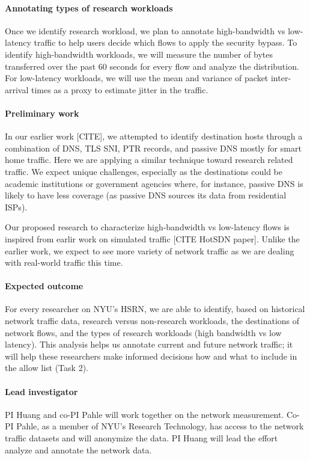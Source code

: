 \paragraph{Annotating types of research workloads}
Once we identify research workload, we plan to annotate high-bandwidth vs low-latency traffic to help users decide which flows to apply the security bypass. To identify high-bandwidth workloads, we will measure the number of bytes transferred over the past 60 seconds for every flow and analyze the distribution. For low-latency workloads, we will use the mean and variance of packet inter-arrival times as a proxy to estimate jitter in the traffic.


\paragraph{Preliminary work}
In our earlier work [CITE], we attempted to identify destination hosts through a combination of DNS, TLS SNI, PTR records, and passive DNS mostly for smart home traffic. Here we are applying a similar technique toward research related traffic. We expect unique challenges, especially as the destinations could be academic institutions or government agencies where, for instance, passive DNS is likely to have less coverage (as passive DNS sources its data from residential ISPs).

Our proposed research to characterize high-bandwidth vs low-latency flows is inspired from earlir work on simulated traffic [CITE HotSDN paper]. Unlike the earlier work, we expect to see more variety of network traffic as we are dealing with real-world traffic this time.


\paragraph{Expected outcome}
For every researcher on NYU's HSRN, we are able to identify, based on historical network traffic data, research versus non-research workloads, the destinations of network flows, and the types of research workloads (high bandwidth vs low latency). This analysis helps us annotate current and future network traffic; it will help these researchers make informed decisions how and what to include in the allow list (Task 2).

\paragraph{Lead investigator} PI Huang and co-PI Pahle will work together on the network measurement. Co-PI Pahle, as a member of NYU's Research Technology, has access to the network traffic datasets and will anonymize the data. PI Huang will lead the effort analyze and annotate the network data.
